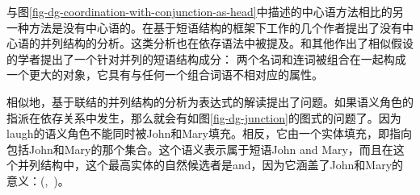与图\ref{fig-dg-coordination-with-conjunction-as-head}中描述的中心语方法相比的另一种方法是没有中心语的。在基于短语结构的框架下工作的几个作者提出了没有中心语的并列结构的分析。这类分析也在依存语法中被提及\citep{Hudson88a,Kahane97a}。\citet{Hudson88a}和其他作出了相似假设的学者提出了一个针对并列的短语结构成分：
两个名词和连词被组合在一起构成一个更大的对象，它具有与任何一个组合词语不相对应的属性。

相似地，基于联结的并列结构的分析为表达式的解读提出了问题。如果语义角色的指派在依存关系中发生，那么就会有如图\ref{fig-dg-junction}的图式的问题了。因为laugh的语义角色不能同时被John和Mary填充。相反，它由一个实体填充，即指向包括John和Mary的那个集合。这个语义表示属于短语John and Mary，而且在这个并列结构中，这个最高实体的自然候选者是and，因为它涵盖了John和Mary的意义：(,~)。

